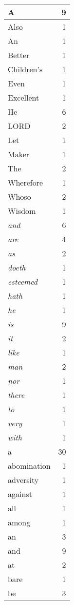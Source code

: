 \begin{center}
\begin{longtable}{l|r}
A & 9\\ \hline 
Also & 1\\ \hline 
An & 1\\ \hline 
Better & 1\\ \hline 
Children's & 1\\ \hline 
Even & 1\\ \hline 
Excellent & 1\\ \hline 
He & 6\\ \hline 
LORD & 2\\ \hline 
Let & 1\\ \hline 
Maker & 1\\ \hline 
The & 2\\ \hline 
Wherefore & 1\\ \hline 
Whoso & 2\\ \hline 
Wisdom & 1\\ \hline 
\emph{and} & 6\\ \hline 
\emph{are} & 4\\ \hline 
\emph{as} & 2\\ \hline 
\emph{doeth} & 1\\ \hline 
\emph{esteemed} & 1\\ \hline 
\emph{hath} & 1\\ \hline 
\emph{he} & 1\\ \hline 
\emph{is} & 9\\ \hline 
\emph{it} & 2\\ \hline 
\emph{like} & 1\\ \hline 
\emph{man} & 2\\ \hline 
\emph{nor} & 1\\ \hline 
\emph{there} & 1\\ \hline 
\emph{to} & 1\\ \hline 
\emph{very} & 1\\ \hline 
\emph{with} & 1\\ \hline 
a & 30\\ \hline 
abomination & 1\\ \hline 
adversity & 1\\ \hline 
against & 1\\ \hline 
all & 1\\ \hline 
among & 1\\ \hline 
an & 3\\ \hline 
and & 9\\ \hline 
at & 2\\ \hline 
bare & 1\\ \hline 
be & 3\\ \hline 

\end{longtable}
\end{center}
